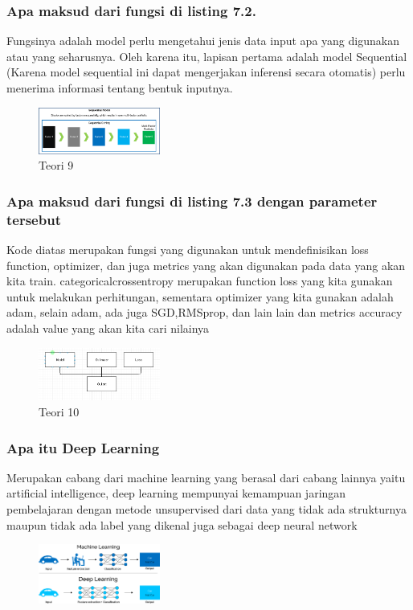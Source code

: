 \subsubsection{Apa maksud dari fungsi di listing 7.2.}
\hfill\break

Fungsinya adalah model perlu mengetahui jenis data input apa yang digunakan atau yang seharusnya. Oleh karena itu, lapisan pertama adalah model Sequential (Karena model sequential ini dapat mengerjakan inferensi secara otomatis) perlu menerima informasi tentang bentuk inputnya.
\begin{figure}[H]
\centering
	\includegraphics[width=4cm]{figures/1174079/7/sequentialmodel.png}
\caption{Teori 9}
\end{figure}

\subsubsection{Apa maksud dari fungsi di listing 7.3 dengan parameter tersebut}
\hfill\break

Kode diatas merupakan fungsi yang digunakan untuk mendefinisikan loss function, optimizer, dan juga metrics yang akan digunakan pada data yang akan kita train. categoricalcrossentropy merupakan function loss yang kita gunakan untuk melakukan perhitungan, sementara optimizer yang kita gunakan adalah adam, selain adam, ada juga SGD,RMSprop, dan lain lain dan metrics accuracy adalah value yang akan kita cari nilainya
\begin{figure}[H]
\centering
	\includegraphics[width=4cm]{figures/1174079/7/modelcompile.PNG}
\caption{Teori 10}
\end{figure}

\subsubsection{Apa itu Deep Learning}
\hfill\break
Merupakan cabang dari machine learning yang berasal dari cabang lainnya yaitu artificial intelligence,  deep learning mempunyai kemampuan jaringan pembelajaran dengan metode unsupervised dari data yang tidak ada strukturnya maupun tidak ada label yang dikenal juga sebagai deep neural network
\begin{figure}[H]
\centering
	\includegraphics[width=4cm]{figures/1174079/7/DeepLearning.png}
\end{figure}

